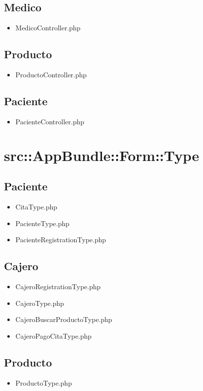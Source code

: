 		\subsection{Medico}
		\begin{itemize}
		\item MedicoController.php
		\end{itemize}
		\subsection{Producto}
		\begin{itemize}
		\item ProductoController.php
		\end{itemize}
		\subsection{Paciente}
		\begin{itemize}
		\item PacienteController.php
		\end{itemize}
		
		
		
	\section{src::AppBundle::Form::Type}
	
		\subsection{Paciente}
		\begin{itemize}
		\item CitaType.php
		\item PacienteType.php
		\item PacienteRegistrationType.php
		
		\end{itemize}
		\subsection{Cajero}
		\begin{itemize}
		\item CajeroRegistrationType.php
		\item CajeroType.php
		\item CajeroBuscarProductoType.php
		\item CajeroPagoCitaType.php
		\end{itemize}
		\subsection{Producto}
		\begin{itemize}
		\item ProductoType.php
		\end{itemize}
		
